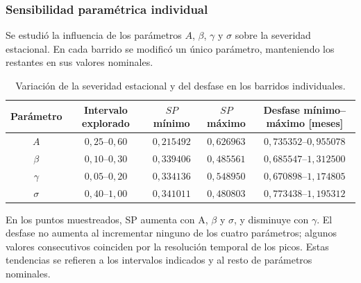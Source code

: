 \subsubsection{Sensibilidad paramétrica individual}

Se estudió la influencia de los parámetros $A$, $\beta$, $\gamma$ y
$\sigma$ sobre la severidad estacional. En cada barrido se modificó un
único parámetro, manteniendo los restantes en sus valores nominales.

\begin{table}[H]
    \centering
    \small
    \caption{Variación de la severidad estacional y del desfase en los
    barridos individuales.}
    \label{tab:parte2-sensibilidad}
    \begin{tabular}{@{} c c c c c @{}}
        \toprule
        Parámetro & Intervalo explorado & $SP$ mínimo & $SP$ máximo &
        Desfase mínimo--máximo [meses] \\
        \midrule
        $A$ & $0{,}25$--$0{,}60$ & $0{,}215492$ & $0{,}626963$ &
        $0{,}735352$--$0{,}955078$ \\
        $\beta$ & $0{,}10$--$0{,}30$ & $0{,}339406$ & $0{,}485561$ &
        $0{,}685547$--$1{,}312500$ \\
        $\gamma$ & $0{,}05$--$0{,}20$ & $0{,}334136$ & $0{,}548950$ &
        $0{,}670898$--$1{,}174805$ \\
        $\sigma$ & $0{,}40$--$1{,}00$ & $0{,}341011$ & $0{,}480803$ &
        $0{,}773438$--$1{,}195312$ \\
        \bottomrule
    \end{tabular}
\end{table}

En los puntos muestreados, SP aumenta con A, $\beta$ y $\sigma$, y disminuye con $\gamma$. El desfase no aumenta al incrementar ninguno de los cuatro parámetros; algunos valores consecutivos coinciden por la resolución temporal de los picos. Estas tendencias se refieren a los intervalos indicados y al resto de parámetros nominales.

